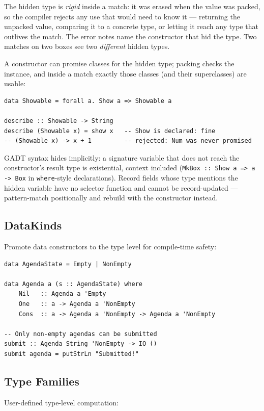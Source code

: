 \documentclass[11pt,a4paper]{article}
\begin{document}
The hidden type is \emph{rigid} inside a match: it was erased when the
value was packed, so the compiler rejects any use that would need to
know it --- returning the unpacked value, comparing it to a concrete
type, or letting it reach any type that outlives the match. The error
notes name the constructor that hid the type. Two matches on two boxes
see two \emph{different} hidden types.

A constructor can promise classes for the hidden type; packing checks
the instance, and inside a match exactly those classes (and their
superclasses) are usable:

\begin{lstlisting}
data Showable = forall a. Show a => Showable a

describe :: Showable -> String
describe (Showable x) = show x   -- Show is declared: fine
-- (Showable x) -> x + 1         -- rejected: Num was never promised
\end{lstlisting}

GADT syntax hides implicitly: a signature variable that does not reach
the constructor's result type is existential, context included
(\texttt{MkBox :: Show a => a -> Box} in \texttt{where}-style
declarations). Record fields whose type mentions the hidden variable
have no selector function and cannot be record-updated --- pattern-match
positionally and rebuild with the constructor instead.

\subsection{DataKinds}

Promote data constructors to the type level for compile-time safety:

\begin{lstlisting}
data AgendaState = Empty | NonEmpty

data Agenda a (s :: AgendaState) where
    Nil   :: Agenda a 'Empty
    One   :: a -> Agenda a 'NonEmpty
    Cons  :: a -> Agenda a 'NonEmpty -> Agenda a 'NonEmpty

-- Only non-empty agendas can be submitted
submit :: Agenda String 'NonEmpty -> IO ()
submit agenda = putStrLn "Submitted!"
\end{lstlisting}

\subsection{Type Families}

User-defined type-level computation:
\end{document}
